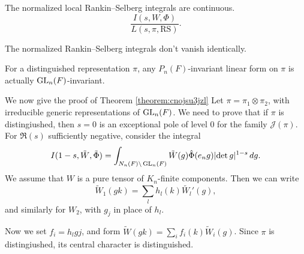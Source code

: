 \documentclass[reqno]{amsart} 
\begin{document}
\begin{proposition}
  The normalized local Rankin--Selberg integrals are continuous.
  \begin{equation*}
    \frac{I(s, W, \Phi)}{L(s, \pi, \mathrm{RS})}.
  \end{equation*}
\end{proposition}
\begin{proposition}
  The normalized Rankin--Selberg integrals don't vanish identically.  
\end{proposition}
\begin{proposition}
  For a distinguished representation $\pi$, any $P_n(F)$-invariant linear form on $\pi$ is actually $\operatorname{GL}_n(F)$-invariant.
\end{proposition}

We now give the proof of Theorem \ref{theorem:cnojsu3jzl}  Let $\pi = \pi_1 \otimes \pi_2$, with irreducible generic representations of $\operatorname{GL}_n(F)$.  We need to prove that if $\pi$ is distingiushed, then $s = 0$ is an exceptional pole of level $0$ for the family $\mathcal{J}(\pi)$.  For $\Re(s)$ sufficiently negative, consider the integral
\begin{equation*}
  I(1 - s, \tilde{W},\tilde{\Phi}) = \int_{N_n(F) \backslash \operatorname{GL}_n(F)}
  \tilde{W}(g) \hat{\Phi}(e_n g) \lvert \det g \rvert^{1 - s} \, d g.
\end{equation*}
We assume that $W$ is a pure tensor of $K_n$-finite components.  Then we can write
\begin{equation*}
  \tilde{W}_1(g k) = \sum_l h_l(k) \tilde{W_l} '(g),
\end{equation*}
and similarly for $W_2$, with $g_j$ in place of $h_l$.

Now we set $f_i = h_l g j$, and form $\tilde{W}(g k) = \sum_i f_i(k) \tilde{W}_i(g)$.  Since $\pi$ is distingiushed, its central character is distinguished.
\end{document}
